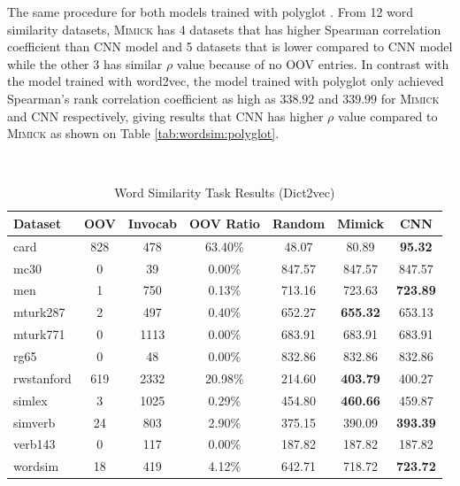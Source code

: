    The same procedure for both models trained with polyglot
    \citep{polyglot2013alrfou}. From 12 word similarity datasets,
    \textsc{Mimick} has 4 datasets that has higher Spearman
    correlation coefficient than CNN model and 5 datasets that is
    lower compared to CNN model while the other 3 has similar $\rho$
    value because of no OOV entries. In contrast with the model
    trained with word2vec, the model trained with polyglot
    \citep{polyglot2013alrfou} only achieved Spearman's rank
    correlation coefficient as high as $338.92$ and $339.99$ for
    \textsc{Mimick} and CNN respectively, giving results that CNN has
    higher $\rho$ value compared to \textsc{Mimick} as shown on Table
    \ref{tab:wordsim:polyglot}.

    \begin{table}[!ht]
      \begin{threeparttable} 
      \begin{center}
        \caption{Word Similarity Task Results (Dict2vec)}
        ~\\
        \label{tab:wordsim:dict2vec}
        \begin{tabular}{l|c|c|c|c|c|c}
          \textbf{Dataset} & \textbf{OOV} & \textbf{Invocab} &
          \textbf{OOV Ratio} & \textbf{Random}\tnote{*} &
          \textbf{Mimick}\tnote{*} & \textbf{CNN}\tnote{*}\\
          \hline
          card & 828 & 478 & 63.40\% & 48.07 & 80.89 & \textbf{95.32}\\
          mc30 & 0 & 39 & 0.00\% & 847.57 & 847.57 & 847.57\\
          men & 1 & 750 & 0.13\% & 713.16 & 723.63 & \textbf{723.89}\\
          mturk287 & 2 & 497 & 0.40\% & 652.27 & \textbf{655.32} & 653.13\\
          mturk771 & 0 & 1113 & 0.00\% & 683.91 & 683.91 & 683.91\\
          rg65 & 0 & 48 & 0.00\% & 832.86 & 832.86 & 832.86\\
          rwstanford & 619 & 2332 & 20.98\% & 214.60 & \textbf{403.79} & 400.27\\
          simlex & 3 & 1025 & 0.29\% & 454.80 & \textbf{460.66} & 459.87\\
          simverb & 24 & 803 & 2.90\% & 375.15 & 390.09 & \textbf{393.39}\\
          verb143 & 0 & 117 & 0.00\% & 187.82 & 187.82 & 187.82\\
          wordsim & 18 & 419 & 4.12\% & 642.71 & 718.72 & \textbf{723.72}\\

\end{tabular}
\end{center}
\end{threeparttable}
\end{table}
